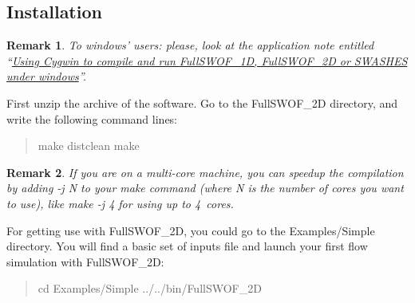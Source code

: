 \documentclass[a4paper, 11pt]{article}
\newcommand{\FullSWOF}{FullSWOF\_2D}
\newtheorem{rmk}{Remark}
\begin{document}
\subsection{Installation}
\begin{rmk}
	To windows' users: please, look at the application note entitled ``\href{https://sourcesup.renater.fr/docman/view.php/895/3949/AppNote-windows.pdf}{Using Cygwin to compile and run  \emph{FullSWOF\_1D}, \FullSWOF{} or \emph{SWASHES} under windows}''.
\end{rmk}

First unzip the archive of the software.
Go to the \FullSWOF{} directory, and write the following command lines:
\begin{quote}
	\textsf{make distclean}\newline
	\textsf{make}
\end{quote}
\begin{rmk}
	If you are on a multi-core machine, you can speedup the compilation by adding \textnormal{\textsf{-j N}} to your make command (where \textnormal{\textsf{N}} is the number of cores you want to use), like \textnormal{\textsf{make -j 4}} for using up to 4~cores.
\end{rmk}

For getting use with \FullSWOF, you could go to the \textsf{Examples/Simple} directory.
You will find a basic set of inputs file and launch your first flow simulation with \FullSWOF\@:
\begin{quote}
	\textsf{cd Examples/Simple}\newline
	\textsf{../../bin/FullSWOF\_2D}
\end{quote}
\end{document}
